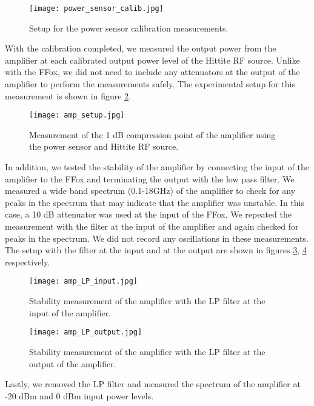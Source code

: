 \documentclass{article}
\begin{document}
\begin{figure}[!htbp]
    \centering
    \texttt{[image: power\_sensor\_calib.jpg]}
    \caption{Setup for the power sensor calibration measurements.}
    \label{fig:powercalib}
\end{figure}

With the calibration completed, we measured the output power from the amplifier at each calibrated output power level of the Hittite RF source. Unlike with the FFox, we did not need to include any attenuators at the output of the amplifier to perform the measurements safely. The experimental setup for this measurement is shown in figure \ref{fig:ampSA}. 

\begin{figure}[!htbp]
    \centering
    \texttt{[image: amp\_setup.jpg]}
    \caption{Measurement of the 1 dB compression point of the amplifier using the power sensor and Hittite RF source.}
    \label{fig:ampSA}
\end{figure}

In addition, we tested the stability of the amplifier by connecting the input of the amplifier to the FFox and terminating the output with the low pass filter. We measured a wide band spectrum (0.1-18GHz) of the amplifier to check for any  peaks in the spectrum that may indicate that the amplifier was unstable. In this case, a 10 dB attenuator was used at the input of the FFox. We repeated the measurement with the filter at the input of the amplifier and again checked for peaks in the spectrum. We did not record any oscillations in these measurements. The setup with the filter at the input and at the output are shown in figures \ref{fig:ampLPinput}, \ref{fig:ampLPoutput} respectively.

\begin{figure}[!htbp]
    \centering
    \texttt{[image: amp\_LP\_input.jpg]}
    \caption{Stability measurement of the amplifier with the LP filter at the input of the amplifier.}
    \label{fig:ampLPinput}
\end{figure}

\begin{figure}[!htbp]
    \centering
    \texttt{[image: amp\_LP\_output.jpg]}
    \caption{Stability measurement of the amplifier with the LP filter at the output of the amplifier.}
    \label{fig:ampLPoutput}
\end{figure}

Lastly, we removed the LP filter and measured the spectrum of the amplifier at -20 dBm and 0 dBm input power levels.
\end{document}

